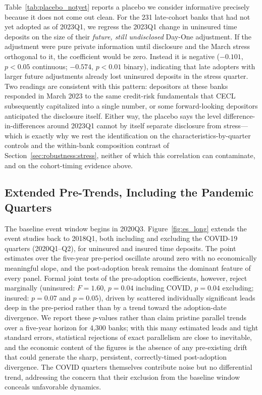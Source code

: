Table~\ref{tab:placebo_notyet} reports a placebo we consider informative
precisely because it does not come out clean.  For the 231 late-cohort banks
that had not yet adopted as of 2023Q1, we regress the 2023Q1 change in
uninsured time deposits on the size of their \emph{future, still
undisclosed} Day-One adjustment.  If the adjustment were pure private
information until disclosure and the March stress orthogonal to it, the
coefficient would be zero.  Instead it is negative ($-0.101$, $p < 0.05$
continuous; $-0.574$, $p < 0.01$ binary), indicating that late adopters with
larger future adjustments already lost uninsured deposits in the stress
quarter.  Two readings are consistent with this pattern: depositors at these
banks responded in March 2023 to the same credit-risk fundamentals that CECL
subsequently capitalized into a single number, or some forward-looking
depositors anticipated the disclosure itself.  Either way, the placebo says
the level difference-in-differences around 2023Q1 cannot by itself separate
disclosure from stress---which is exactly why we rest the identification on
the characteristics-by-quarter controls and the within-bank composition
contrast of Section~\ref{sec:robustness:stress}, neither of which this
correlation can contaminate, and on the cohort-timing evidence above.

\subsection{Extended Pre-Trends, Including the Pandemic Quarters}
\label{sec:robustness:pretrends}

The baseline event window begins in 2020Q3.  Figure~\ref{fig:es_long}
extends the event studies back to 2018Q1, both including and excluding the
COVID-19 quarters (2020Q1--Q2), for uninsured and insured time deposits.
The point estimates over the five-year pre-period oscillate around zero with
no economically meaningful slope, and the post-adoption break remains the
dominant feature of every panel.  Formal joint tests of the pre-adoption
coefficients, however, reject marginally (uninsured: $F = 1.60$, $p = 0.04$
including COVID, $p = 0.04$ excluding; insured: $p = 0.07$ and $p = 0.05$),
driven by scattered individually significant leads deep in the pre-period
rather than by a trend toward the adoption-date divergence.  We report these
$p$-values rather than claim pristine parallel trends over a five-year
horizon for 4,300 banks; with this many estimated leads and tight standard
errors, statistical rejections of exact parallelism are close to inevitable,
and the economic content of the figures is the absence of any pre-existing
drift that could generate the sharp, persistent, correctly-timed
post-adoption divergence.  The COVID quarters themselves contribute noise
but no differential trend, addressing the concern that their exclusion from
the baseline window conceals unfavorable dynamics.

